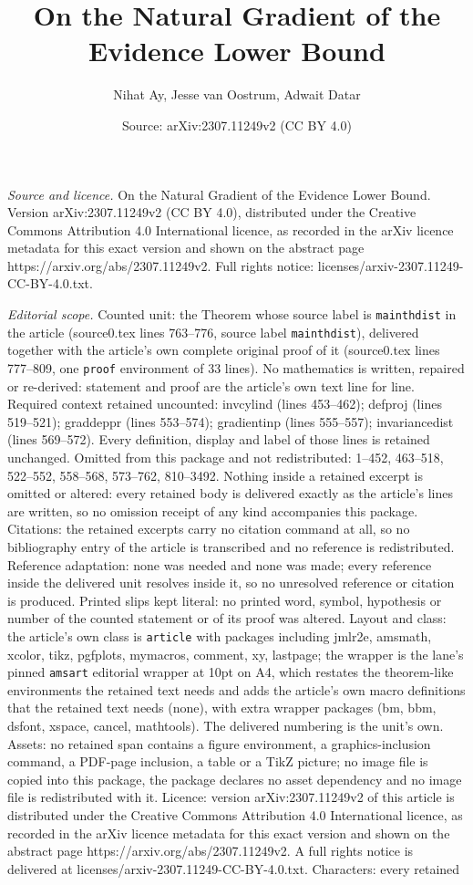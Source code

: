 \documentclass[10pt,a4paper]{amsart}
\title[On the Natural Gradient of the Evidence Lower Bound]{On the Natural Gradient of the Evidence Lower Bound}
\author{Nihat Ay, Jesse van Oostrum, Adwait Datar}
\date{Source: arXiv:2307.11249v2 (CC BY 4.0)}
\begin{document}
\maketitle

\noindent\emph{Source and licence.} On the Natural Gradient of the Evidence Lower Bound. Version arXiv:2307.11249v2 (CC BY 4.0), distributed under the Creative Commons Attribution 4.0 International licence, as recorded in the arXiv licence metadata for this exact version and shown on the abstract page https://arxiv.org/abs/2307.11249v2. Full rights notice: licenses/arxiv-2307.11249-CC-BY-4.0.txt.\par\smallskip

\noindent\textit{Editorial scope.} Counted unit: the Theorem whose source label is \texttt{mainthdist} in the article (source0.tex lines 763--776, source label \texttt{mainthdist}), delivered together with the article's own complete original proof of it (source0.tex lines 777--809, one \texttt{proof} environment of 33 lines). No mathematics is written, repaired or re-derived: statement and proof are the article's own text line for line. Required context retained uncounted: invcylind (lines 453--462); defproj (lines 519--521); graddeppr (lines 553--574); gradientinp (lines 555--557); invariancedist (lines 569--572). Every definition, display and label of those lines is retained unchanged. Omitted from this package and not redistributed: 1--452, 463--518, 522--552, 558--568, 573--762, 810--3492. Nothing inside a retained excerpt is omitted or altered: every retained body is delivered exactly as the article's lines are written, so no omission receipt of any kind accompanies this package. Citations: the retained excerpts carry no citation command at all, so no bibliography entry of the article is transcribed and no reference is redistributed. Reference adaptation: none was needed and none was made; every reference inside the delivered unit resolves inside it, so no unresolved reference or citation is produced. Printed slips kept literal: no printed word, symbol, hypothesis or number of the counted statement or of its proof was altered. Layout and class: the article's own class is \texttt{article} with packages including jmlr2e, amsmath, xcolor, tikz, pgfplots, mymacros, comment, xy, lastpage; the wrapper is the lane's pinned \texttt{amsart} editorial wrapper at 10pt on A4, which restates the theorem-like environments the retained text needs and adds the article's own macro definitions that the retained text needs (none), with extra wrapper packages (bm, bbm, dsfont, xspace, cancel, mathtools). The delivered numbering is the unit's own. Assets: no retained span contains a figure environment, a graphics-inclusion command, a PDF-page inclusion, a table or a TikZ picture; no image file is copied into this package, the package declares no asset dependency and no image file is redistributed with it. Licence: version arXiv:2307.11249v2 of this article is distributed under the Creative Commons Attribution 4.0 International licence, as recorded in the arXiv licence metadata for this exact version and shown on the abstract page https://arxiv.org/abs/2307.11249v2. A full rights notice is delivered at licenses/arxiv-2307.11249-CC-BY-4.0.txt. Characters: every retained 
\end{document}
